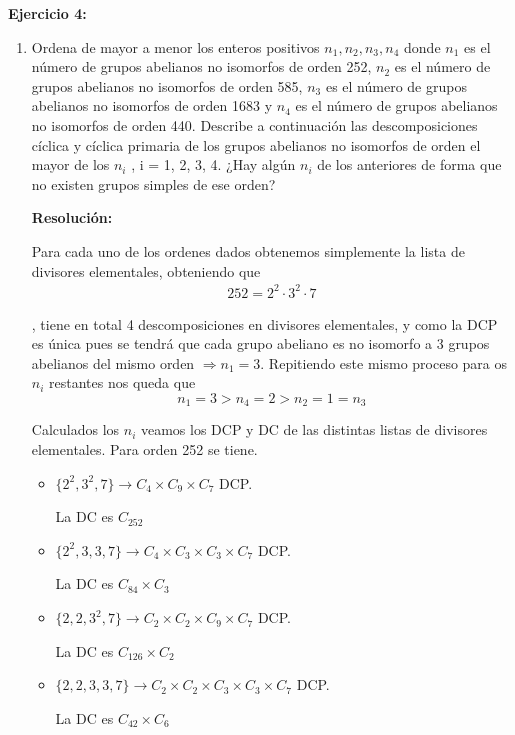 \documentclass{article}
\begin{document}
\textbf{Ejercicio 4:}
\begin{enumerate}
\item Ordena de mayor a menor los enteros positivos $n_1, n_2, n_3, n_4$ donde $n_1$ es el número de grupos abelianos no isomorfos de orden 252, $n_2$ es el número de grupos abelianos no isomorfos de orden 585, $n_3$ es el número de grupos abelianos no isomorfos de orden 1683 y $n_4$ es el número de grupos abelianos no isomorfos de orden 440. Describe a continuación las descomposiciones cíclica y cíclica primaria de los grupos abelianos no isomorfos de orden el mayor de los $n_i$ , i = 1, 2, 3, 4. ¿Hay algún $n_i$ de los anteriores de forma que no existen grupos simples de ese orden?

\textbf{Resolución:}

Para cada uno de los ordenes dados obtenemos simplemente la lista de divisores elementales, obteniendo que 
\begin{gather*}
252=2^2\cdot 3^2\cdot 7
\end{gather*}

, tiene en total 4 descomposiciones en divisores elementales, y como la DCP es única pues se tendrá que cada grupo abeliano es no isomorfo a 3 grupos abelianos del mismo orden $\Rightarrow n_1=3$. Repitiendo este mismo proceso para os $n_i$ restantes nos queda que
\begin{equation*}
n_1=3>n_4=2>n_2=1=n_3
\end{equation*}

Calculados los $n_i$ veamos los DCP y DC de las distintas listas de divisores elementales. Para orden 252 se tiene.
\begin{itemize}
\item $\{2^2,3^2,7\}\longrightarrow C_4\times C_9\times C_7$ DCP.

La DC es $C_{252}$

\item $\{2^2,3,3,7\}\longrightarrow C_4\times C_3\times C_3\times C_7$ DCP.

La DC es $C_{84}\times C_3$

\item $\{2,2,3^2,7\}\longrightarrow C_2\times C_2\times C_9\times C_7$ DCP.

La DC es $C_{126}\times C_2$

\item $\{2,2,3,3,7\}\longrightarrow C_2\times C_2\times C_3\times C_3\times C_7$ DCP.

La DC es $C_{42}\times C_6$
\end{itemize}


\end{enumerate}
\end{document}
